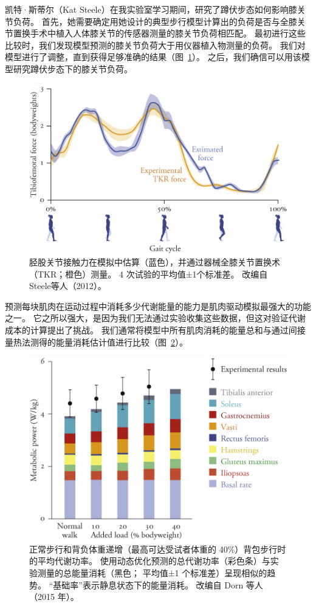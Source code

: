 凯特·斯蒂尔（Kat Steele）在我实验室学习期间，研究了蹲伏步态如何影响膝关节负荷。
首先，她需要确定用她设计的典型步行模型计算出的负荷是否与全膝关节置换手术中植入人体膝关节的传感器测量的膝关节负荷相匹配。
最初进行这些比较时，我们发现模型预测的膝关节负荷大于用仪器植入物测量的负荷。
我们对模型进行了调整，直到获得足够准确的结果（图~\ref{fig:10_12}）。
之后，我们确信可以用该模型研究蹲伏步态下的膝关节负荷。


\begin{figure}[!htb]
	\centering
	\includegraphics[width=0.8\linewidth]{chap10/10_12}
	\caption{胫股关节接触力在模拟中估算（蓝色），并通过器械全膝关节置换术（TKR；橙色）测量。
		4 次试验的平均值±1个标准差。
		改编自Steele等人（2012）。 \label{fig:10_12}}
\end{figure}


预测每块肌肉在运动过程中消耗多少代谢能量的能力是肌肉驱动模拟最强大的功能之一。
它之所以强大，是因为我们无法通过实验收集这些数据，但这对验证代谢成本的计算提出了挑战。
我们通常将模型中所有肌肉消耗的能量总和与通过间接量热法测得的能量消耗估计值进行比较（图~\ref{fig:10_13}）。


\begin{figure}[!htb]
	\centering
	\includegraphics[width=0.8\linewidth]{chap10/10_13}
	\caption{正常步行和背负体重递增（最高可达受试者体重的 40\%）背包步行时的平均代谢功率。
		使用动态优化预测的总代谢功率（彩色条）与实验测量的总能量消耗（黑色；
		平均值±1 个标准差）呈现相似的趋势。
		“基础率”表示静息状态下的能量消耗。
		改编自 Dorn 等人（2015 年）。 \label{fig:10_13}}
\end{figure}


